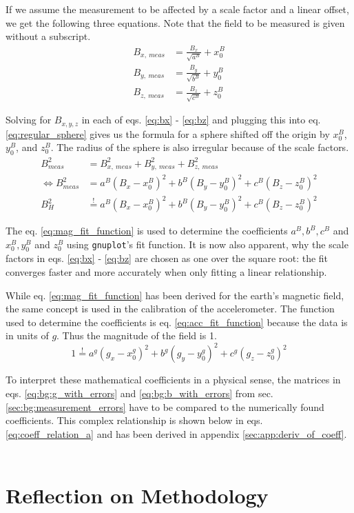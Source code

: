 If we assume the measurement to be affected by a scale factor and a linear offset, we get the following three equations. Note that the field to be measured is given without a subscript.
\begin{align}
    B_{x,\ meas} &= \frac{B_x}{\sqrt{a^B}}+x_0^B \label{eq:bx}\\
    B_{y,\ meas} &= \frac{B_y}{\sqrt{b^B}}+y_0^B \label{eq:by}\\
    B_{z,\ meas} &= \frac{B_z}{\sqrt{c^B}}+z_0^B \label{eq:bz}
\end{align}

Solving for $B_{x,y,z}$ in each of eqs. \eqref{eq:bx} - \eqref{eq:bz} and plugging this into eq. \eqref{eq:regular_sphere} gives us the formula for a sphere shifted off the origin by $x_0^B$, $y_0^B$, and $z_0^B$. The radius of the sphere is also irregular because of the scale factors.
\begin{align}
    B_{meas}^2&= B_{x,\ meas}^2 + B_{y,\ meas}^2 + B_{z,\ meas}^2\\
    \iff B_{meas}^2&=a^B(B_x-x_0^B)^2 + b^B(B_y-y_0^B)^2 + c^B(B_z-z_0^B)^2 
    \label{eq:irregular_sphere}\\
    B_H^2&\overset{!}{=}a^B(B_x-x_0^B)^2 + b^B(B_y-y_0^B)^2 + c^B(B_z-z_0^B)^2
    \label{eq:mag_fit_function}
\end{align}

 The eq. \eqref{eq:mag_fit_function} is used to determine the coefficients $a^B,b^B,c^B$ and $x_0^B,y_0^B$ and $z_0^B$ using \verb|gnuplot|'s fit function. It is now also apparent, why the scale factors in eqs. \eqref{eq:bx} - \eqref{eq:bz} are chosen as one over the square root: the fit converges faster and more accurately when only fitting a linear relationship.

While eq. \eqref{eq:mag_fit_function} has been derived for the earth's magnetic field, the same concept is used in the calibration of the accelerometer. The function used to determine the coefficients is eq. \eqref{eq:acc_fit_function} because the data is in units of $g$. Thus the magnitude of the field is 1.
\begin{equation}
    1\overset{!}{=}a^g(g_x-x_0^g)^2 + b^g(g_y-y_0^g)^2 + c^g(g_z-z_0^g)^2
    \label{eq:acc_fit_function}
\end{equation}

To interpret these mathematical coefficients in a physical sense, the matrices in eqs. \ref{eq:bg:g_with_errors} and \eqref{eq:bg:b_with_errors} from sec. \ref{sec:bg:measurement_errors} have to be compared to the numerically found coefficients. This complex relationship is shown below in eqs. \ref{eq:coeff_relation_a} and has been derived in appendix \ref{sec:app:deriv_of_coeff}.

\begin{align}
    
\end{align}

\section{Reflection on Methodology \label{sec:meth:reflection_methodology}}